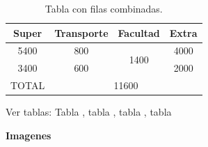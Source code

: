 \documentclass[]{article} %
\begin{document}
        \begin{table}[H] %
            \centering
            \caption{Tabla con filas combinadas.}
            \begin{tabular}{|c|c|c|c|}
                \hline
                Super & Transporte & Facultad & Extra \\
                \hline
                5400 & 800 & \multirow[c]{2}{*}{1400} & 4000 \\
                \cline{1-2}
                \cline{4-4}
                3400 & 600 &  & 2000 \\
                \hline
                TOTAL & \multicolumn{3}{|c|}{11600} \\

                
            \end{tabular}
            \label{tab:datos4}
        \end{table}

        Ver tablas: 
            Tabla , tabla , tabla , tabla  
         
        \pagebreak
        \textbf{Imagenes}

\end{document}
